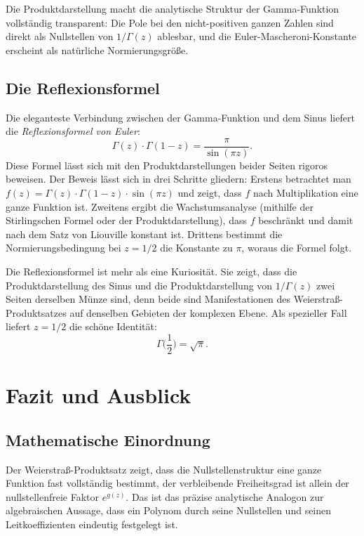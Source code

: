 Die Produktdarstellung macht die analytische Struktur der Gamma-Funktion
vollständig transparent:
Die Pole bei den nicht-positiven ganzen Zahlen sind direkt als Nullstellen
von $1/\Gamma(z)$ ablesbar, und die Euler-Mascheroni-Konstante erscheint
als natürliche Normierungsgröße.

\subsection{Die Reflexionsformel}

Die eleganteste Verbindung zwischen der Gamma-Funktion und dem Sinus
liefert die \emph{Reflexionsformel von Euler}:
%
\begin{equation}
\Gamma(z) \cdot \Gamma(1-z)
=
\frac{\pi}{\sin(\pi z)}.
\end{equation}
Diese Formel lässt sich mit den Produktdarstellungen beider Seiten rigoros beweisen.
Der Beweis lässt sich in drei Schritte gliedern:
Erstens betrachtet man $f(z) = \Gamma(z) \cdot \Gamma(1-z) \cdot \sin(\pi z)$
und zeigt, dass $f$ nach Multiplikation eine ganze Funktion ist.
Zweitens ergibt die Wachstumsanalyse (mithilfe der Stirlingschen Formel
oder der Produktdarstellung), dass $f$ beschränkt und damit nach dem
Satz von Liouville konstant ist.
Drittens bestimmt die Normierungsbedingung bei $z = 1/2$ die Konstante zu $\pi$,
woraus die Formel folgt.

Die Reflexionsformel ist mehr als eine Kuriosität.
Sie zeigt, dass die Produktdarstellung des Sinus und die Produktdarstellung
von $1/\Gamma(z)$ zwei Seiten derselben Münze sind,
denn beide sind Manifestationen des Weierstraß-Produktsatzes auf denselben
Gebieten der komplexen Ebene.
Als spezieller Fall liefert $z = 1/2$ die schöne Identität:
\begin{equation}
\Gamma\!\biggl(\frac{1}{2}\biggr) = \sqrt{\pi}.
\end{equation}

\section{Fazit und Ausblick}

\subsection{Mathematische Einordnung}

Der Weierstraß-Produktsatz zeigt, dass die Nullstellenstruktur eine ganze Funktion
fast vollständig bestimmt, der verbleibende Freiheitsgrad ist allein der
nullstellenfreie Faktor $e^{g(z)}$.
Das ist das präzise analytische Analogon zur algebraischen Aussage,
dass ein Polynom durch seine Nullstellen und seinen Leitkoeffizienten
eindeutig festgelegt ist.

